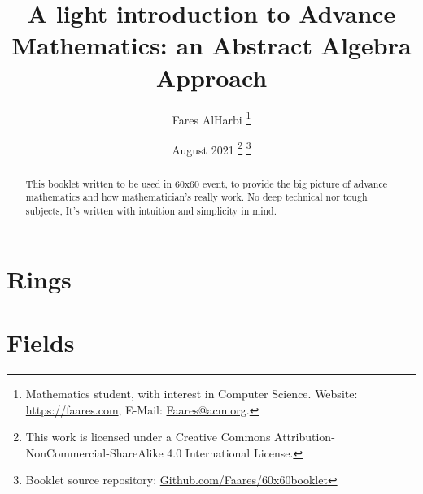 \documentclass{article}
\title{A light introduction to Advance Mathematics: an Abstract Algebra Approach}
\author{Fares AlHarbi \thanks{Mathematics student, with interest in Computer Science. Website: \href{https://Faares.com}{https://faares.com}, E-Mail: \href{mailto:faares@acm.org}{Faares@acm.org}.} }
\date{August 2021 \footnote{This work is licensed under a Creative Commons Attribution-NonCommercial-ShareAlike 4.0 International License.} \footnote{Booklet source repository: \href{https://github.com/Faares/60x60booklet}{Github.com/Faares/60x60booklet}}}
\begin{document}
\maketitle
\begin{abstract}
    This booklet written to be used in \hyperlink{https://salla.sa/durba/RYePmz}{60x60} event,
    to provide the big picture of advance mathematics and how mathematician's really work.
    No deep technical nor tough subjects, It's written with intuition and simplicity in mind. 
\end{abstract}

\clearpage
\tableofcontents 




\clearpage


\clearpage

\clearpage

\clearpage

\clearpage

\clearpage

\clearpage
\section{Rings}
\clearpage
\section{Fields}

\clearpage
\printbibliography[heading=bibintoc]
\end{document}
